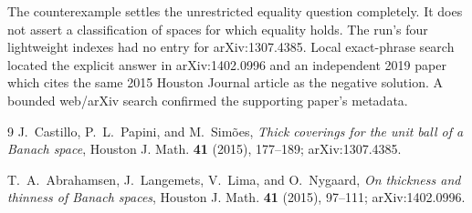 \documentclass[11pt]{article}
\begin{document}
The counterexample settles the unrestricted equality question completely.
It does not assert a classification of spaces for which equality holds.
The run's four lightweight indexes had no entry for arXiv:1307.4385.  Local
exact-phrase search located the explicit answer in arXiv:1402.0996 and an
independent 2019 paper which cites the same 2015 Houston Journal article as the
negative solution.  A bounded web/arXiv search confirmed the supporting
paper's metadata.

\begin{thebibliography}{9}
J.~Castillo, P.~L.~Papini, and M.~Sim\~oes,
\emph{Thick coverings for the unit ball of a Banach space},
Houston J. Math. \textbf{41} (2015), 177--189; arXiv:1307.4385.

T.~A.~Abrahamsen, J.~Langemets, V.~Lima, and O.~Nygaard,
\emph{On thickness and thinness of Banach spaces},
Houston J. Math. \textbf{41} (2015), 97--111; arXiv:1402.0996.
\end{thebibliography}
\end{document}
